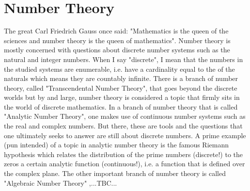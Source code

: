\chapter{Number Theory}
The great Carl Friedrich Gauss once said: "Mathematics is the queen of the sciences and number theory is the queen of mathematics". Number theory is mostly concerned with questions about discrete number systems such as the natural and integer numbers. When I say "discrete", I mean that the numbers in the studied systems are enumerable, i.e. have a cardinality equal to the of the naturals which means they are countably infinite. There is a branch of number theory, called "Transcendental Number Theory", that goes beyond the discrete worlds but by and large, number theory is considered a topic that firmly sits in the world of discrete mathematics. In a branch of number theory that is called "Analytic Number Theory", one makes use of continuous number systems such as the real and complex numbers. But there, these are tools and the questions that one ultimately seeks to answer are still about discrete numbers. A prime example (pun intended) of a topic in analytic number theory is the famous Riemann hypothesis which relates the distribution of the prime numbers (discrete!) to the zeros a certain analytic function (continuous!), i.e. a function that is defined over the complex plane. The other important branch of number theory is called "Algebraic Number Theory" ,...TBC...


\begin{comment}
	
Topics:
-Divisibility: Euclidean algo ((ext.) GCD, LCM), Primes, Factorization
-Modular Arithmetic
-Diophantine Equations
 -Fermat's Last Theorem
  -Pythagorean Triples
-Algberaic Numbers 
 -Roots of polynomials with coeffs in z, 
  -for Algebraic Integer, the polynomial must be monic


Resources:
https://en.wikipedia.org/wiki/Number_theory
https://en.wikipedia.org/wiki/Diophantine_equation
https://en.wikipedia.org/wiki/Transcendental_number_theory
	
\end{comment}